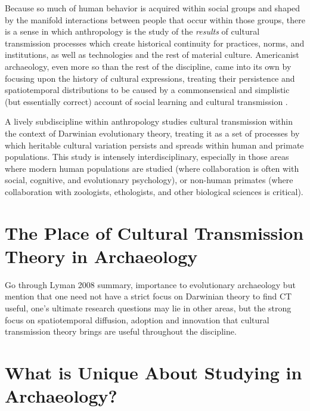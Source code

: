 

Because so much of human behavior is acquired within social groups and shaped by the manifold interactions between people that occur within those groups, there is a sense in which anthropology is the study of the \emph{results} of cultural transmission processes which create historical continuity for practices, norms, and institutions, as well as technologies and the rest of material culture.  Americanist archaeology, even more so than the rest of the discipline, came into its own by focusing upon the history of cultural expressions, treating their persistence and spatiotemporal distributions to be caused by a commonsensical and simplistic (but essentially correct) account of social learning and cultural transmission \citep{Lyman2008}.     

A lively subdiscipline within anthropology studies cultural transmission within the context of Darwinian evolutionary theory, treating it as a set of processes by which heritable cultural variation persists and spreads within human and primate populations.  This study is intensely interdisciplinary, especially in those areas where modern human populations are studied (where collaboration is often with social, cognitive, and evolutionary psychology), or non-human primates (where collaboration with zoologists, ethologists, and other biological sciences is critical).  



\section{The Place of Cultural Transmission Theory in Archaeology}
\label{sec:place-ct-in-archy}

Go through Lyman 2008 summary, importance to evolutionary archaeology but mention that one need not have a strict focus on Darwinian theory to find CT useful, one's ultimate research questions may lie in other areas, but the strong focus on spatiotemporal diffusion, adoption and innovation that cultural transmission theory brings are useful throughout the discipline.  





\section{What is Unique About Studying \CT in Archaeology?}
\label{sec:ct-archy-different}



